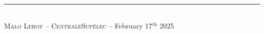\documentclass[a4paper, notitlepage]{report}
\begin{document}
\newcommand{\HRule}{\rule{\linewidth}{0.5mm}}



\thispagestyle{empty}


\thispagestyle{empty}
\setcounter{page}{0}


\renewcommand{\arraystretch}{1.5}


~
\thispagestyle{empty}
\setcounter{page}{0}
\newpage



\newpage



\newpage



\newpage



\newpage

\renewcommand{\thepage}{}

\printbibliography

\HRule \\[0.4cm]
\hfill{} \textsc{Malo \textsc{Leroy}} -- \textsc{CentraleSupélec} -- February 17${}^\text{th}$ 2025
\end{document}
